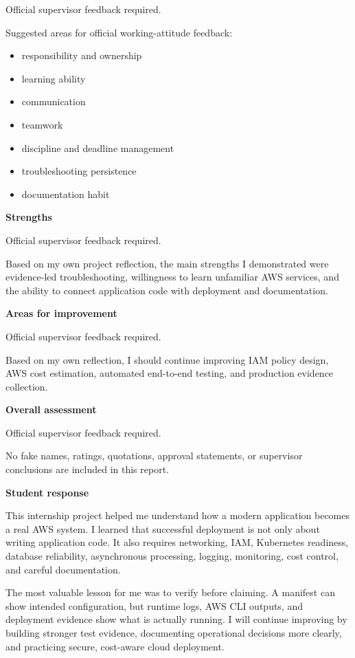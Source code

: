 Official supervisor feedback required.

Suggested areas for official working-attitude feedback:

\begin{itemize}
\tightlist
\item
  responsibility and ownership
\item
  learning ability
\item
  communication
\item
  teamwork
\item
  discipline and deadline management
\item
  troubleshooting persistence
\item
  documentation habit
\end{itemize}

\vspace{0.5em}\noindent\textbf{Strengths}\par

Official supervisor feedback required.

Based on my own project reflection, the main strengths I demonstrated
were evidence-led troubleshooting, willingness to learn unfamiliar AWS
services, and the ability to connect application code with deployment
and documentation.

\vspace{0.5em}\noindent\textbf{Areas for improvement}\par

Official supervisor feedback required.

Based on my own reflection, I should continue improving IAM policy
design, AWS cost estimation, automated end-to-end testing, and
production evidence collection.

\vspace{0.5em}\noindent\textbf{Overall assessment}\par

Official supervisor feedback required.

No fake names, ratings, quotations, approval statements, or supervisor
conclusions are included in this report.

\vspace{0.5em}\noindent\textbf{Student response}\par

This internship project helped me understand how a modern application
becomes a real AWS system. I learned that successful deployment is not
only about writing application code. It also requires networking, IAM,
Kubernetes readiness, database reliability, asynchronous processing,
logging, monitoring, cost control, and careful documentation.

The most valuable lesson for me was to verify before claiming. A
manifest can show intended configuration, but runtime logs, AWS CLI
outputs, and deployment evidence show what is actually running. I will
continue improving by building stronger test evidence, documenting
operational decisions more clearly, and practicing secure, cost-aware
cloud deployment.
